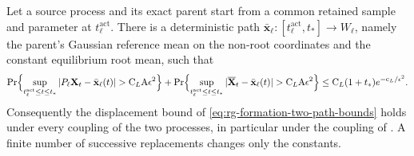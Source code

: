 Let a source process and its exact parent start from a common retained sample
and parameter at \(t^{\mathrm{act}}_\ell\). There is a deterministic path
\(\bar{\mathbf x}_\ell:[t^{\mathrm{act}}_\ell,t_*]\to W_\ell\), namely the
parent's Gaussian reference mean on the non-root coordinates and the constant
equilibrium root mean, such that
\begin{equation}
 \Pr\Bigl\{\sup_{t^{\mathrm{act}}_\ell\le t\le t_*}|P_\ell\mathbf X_t-\bar{\mathbf x}_\ell(t)|
   >\mathrm C_L\mathrm A\epsilon^2\Bigr\}
 +\Pr\Bigl\{\sup_{t^{\mathrm{act}}_\ell\le t\le t_*}|\overline{\mathbf X}_t-\bar{\mathbf x}_\ell(t)|
   >\mathrm C_L\mathrm A\epsilon^2\Bigr\}
 \le \mathrm C_L(1+t_*)e^{-\mathrm c_L/\epsilon^2}.
 \label{eq:rg-formation-common-path-proof}
\end{equation}
Consequently the displacement bound of \cref{eq:rg-formation-two-path-bounds}
holds under every coupling of the two processes, in particular under the
coupling of . A finite number of
successive replacements changes only the constants. 

